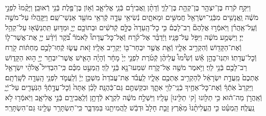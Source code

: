 \documentclass[twoside, openany, parskip=half, 11pt]{book}
\begin{document}
\begin{footnotesize}
\begin{multicols}{2}
\\
וַיִּקַּ֣ח קֹ֔רַח בֶּן־יִצְהָ֥ר בֶּן־קְהָ֖ת בֶּן־לֵוִ֑י וְֿדָתָ֨ן וַֽאֲבִירָ֜ם בְּֿנֵ֧י אֱלִיאָ֛ב וְֿא֥וֹן בֶּן־פֶּ֖לֶת בְּֿנֵ֥י רְֿאוּבֵֽן׃ וַיָּקֻ֨מוּ֙ לִפְנֵ֣י מֹשֶׁ֔ה וַֽאֲנָשִׁ֥ים מִבְּֿנֵֽי־יִשְׂרָאֵ֖ל חֲמִשִּׁ֣ים וּמָאתָ֑יִם נְֿשִׂיאֵ֥י עֵדָ֛ה קְֿרִאֵ֥י מוֹעֵ֖ד אַנְשֵׁי־שֵֽׁם׃ וַיִּֽקָּֽהֲלוּ עַל־מֹשֶׁ֣ה וְֿעַֽל־אַֽהֲרֹ֗ן וַיֹּֽאמְֿר֣וּ אֲלֵהֶם֘ רַב־לָכֶם֒ כִּ֤י כׇל־הָֽעֵדָה֙ כֻּלָּ֣ם קְֿדֹשִׁ֔ים וּבְתוֹכָ֖ם יְיָ֑ וּמַדּ֥וּעַ תִּֽתְנַשְּֿׂא֖וּ עַל־קְהַ֥ל יְיָ׃  וַיִּשְׁמַ֣ע מֹשֶׁ֔ה וַיִּפֹּ֖ל עַל־פָּנָֽיו׃ וַיְֿדַבֵּ֨ר אֶל־קֹ֜רַח וְֿאֶל־כׇּל־עֲדָתוֹ֘ לֵאמֹר֒ בֹּ֠קֶר וְֿיֹדַ֨ע יְיָ֧ אֶת־אֲשֶׁר־ל֛וֹ וְֿאֶת־הַקָּד֖וֹשׁ וְֿהִקְרִ֣יב אֵלָ֑יו וְֿאֵ֛ת אֲשֶׁ֥ר יִבְחַר־בּ֖וֹ יַקְרִ֥יב אֵלָֽיו׃ זֹ֖את עֲשׂ֑וּ קְֿחֽוּ־לָכֶ֣ם מַחְתּ֔וֹת קֹ֖רַח וְֿכׇל־עֲדָתֽוֹ׃ וּתְנֽוּ־בָהֵ֣ן אֵ֡שׁ וְֿשִׂ֩ימוּ֩ עֲלֵיהֶ֨ן קְֿטֹ֜רֶת לִפְנֵ֤י יְיָ֙ מָחָ֔ר וְֿהָיָ֗ה הָאִ֛ישׁ אֲשֶׁר־יִבְחַ֥ר יְיָ֖ ה֣וּא הַקָּד֑וֹשׁ רַב־לָכֶ֖ם בְּֿנֵ֥י לֵוִֽי׃  וַיֹּ֥אמֶר מֹשֶׁ֖ה אֶל־קֹ֑רַח שִׁמְעוּ־נָ֖א בְּֿנֵ֥י לֵוִֽי׃ הַֽמְעַ֣ט מִכֶּ֗ם כִּֽי־הִבְדִּיל֩ אֱלֹהֵ֨י יִשְׂרָאֵ֤ל אֶתְכֶם֙ מֵֽעֲדַ֣ת יִשְׂרָאֵ֔ל לְֿהַקְרִ֥יב אֶתְכֶ֖ם אֵלָ֑יו לַֽעֲבֹ֗ד אֶת־עֲבֹדַת֙ מִשְׁכַּ֣ן יְיָ֔ וְֿלַֽעֲמֹ֛ד לִפְנֵ֥י הָֽעֵדָ֖ה לְֿשָֽׁרְֿתָֽם׃ וַיַּקְרֵב֙ אֹֽתְֿךָ֔ וְֿאֶת־כׇּל־אַחֶ֥יךָ בְֿנֵֽי־לֵוִ֖י אִתָּ֑ךְ וּבִקַּשְׁתֶּ֖ם גַּם־כְּֿהֻנָּֽה׃ לָכֵ֗ן אַתָּה֙ וְֿכׇל־עֲדָ֣תְֿךָ֔ הַנֹּֽעָדִ֖ים עַל־יְֿיָ֑ וְֿאַֽהֲרֹ֣ן מַה־ה֔וּא כִּ֥י תַלִּ֖ונוּ [ק‘ תַלִּ֖ינוּ] עָלָֽיו׃ וַיִּשְׁלַ֣ח מֹשֶׁ֔ה לִקְרֹ֛א לְֿדָתָ֥ן וְֿלַֽאֲבִירָ֖ם בְּֿנֵ֣י אֱלִיאָ֑ב וַיֹּֽאמְֿר֖וּ לֹ֥א נַֽעֲלֶֽה׃ הַֽמְעַ֗ט כִּ֤י הֶֽעֱלִיתָ֨נוּ֙ מֵאֶ֨רֶץ זָבַ֤ת חָלָב֙ וּדְבַ֔שׁ לַֽהֲמִיתֵ֖נוּ בַּמִּדְבָּ֑ר כִּֽי־תִשְׂתָּרֵ֥ר עָלֵ֖ינוּ גַּם־הִשְׂתָּרֵֽר׃


\end{multicols}
\end{footnotesize}
\end{document}

